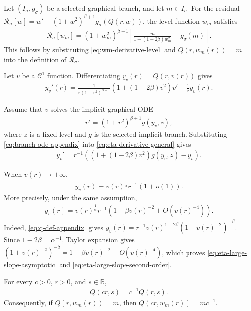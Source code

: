\documentclass{amsart}
\theoremstyle{plain}
\theoremstyle{mainintrothm}
\theoremstyle{definition}
\begin{document}
Let $(I_\sigma,g_\sigma)$ be a selected graphical branch, and let $m\in I_\sigma$.
For the residual
$\mathcal R_\sigma[w]=w'-(1+w^2)^{\beta+1}g_\sigma(Q(r,w))$, the level function
$w_m$ satisfies
\begin{align}
	\label{eq:wm-residual-branch}
	\mathcal R_\sigma[w_m]
	=
	(1+w_m^2)^{\beta+1}
	\left[
	\frac{m}{1+(1-2\beta)w_m^2}
	-
	g_\sigma(m)
	\right].
\end{align}
This follows by substituting \eqref{eq:wm-derivative-level} and
$Q(r,w_m(r))=m$ into the definition of $\mathcal R_\sigma$.

\medskip

Let $v$ be a $\mathcal C^1$ function.  Differentiating
$y_v(r)=Q(r,v(r))$ gives
\begin{align}
	\label{eq:eta-derivative-general}
	y_v'(r)
	=
	\frac{1}{r(1+v^2)^{\beta+1}}
	\left(1+(1-2\beta)v^2\right)v'
	-
	\frac{1}{r}y_v(r).
\end{align}

Assume that $v$ solves the implicit graphical ODE
\begin{align}
	\label{eq:branch-ode-appendix}
	v'
	=
	(1+v^2)^{\beta+1}g(y_v,z),
\end{align}
where $z$ is a fixed level and $g$ is the selected implicit branch.  Substituting
\eqref{eq:branch-ode-appendix} into \eqref{eq:eta-derivative-general} gives
\begin{align}
	\label{eq:eta-derivative-branch}
	y_v'
	=
r^{-1}
	\left(
	\left(1+(1-2\beta)v^2\right)g(y_v,z)
	-
	y_v
	\right).
\end{align}

When $v(r)\to+\infty$,
\begin{align}
	\label{eq:eta-large-slope-asymptotic}
	y_v(r)
	=
	v(r)^{\frac{1}{\alpha}}r^{-1}(1+o(1)).
\end{align}
More precisely, under the same assumption,
\begin{align}
	\label{eq:eta-large-slope-second-order}
	y_v(r)
	=
	v(r)^{\frac{1}{\alpha}}r^{-1}
	\left(1-\beta v(r)^{-2}+O(v(r)^{-4})\right).
\end{align}
Indeed, \eqref{eq:q-def-appendix} gives
$y_v(r)=r^{-1}v(r)^{1-2\beta}(1+v(r)^{-2})^{-\beta}$.  Since
$1-2\beta=\alpha^{-1}$, Taylor expansion gives
$(1+v(r)^{-2})^{-\beta}=1-\beta v(r)^{-2}+O(v(r)^{-4})$, which proves
\eqref{eq:eta-large-slope-asymptotic} and
\eqref{eq:eta-large-slope-second-order}.

\medskip

For every $c>0$, $r>0$, and $s\in\mathbb R$,
\begin{align}
	\label{eq:q-scaling}
	Q(cr,s)=c^{-1}Q(r,s).
\end{align}
Consequently, if $Q(r,w_m(r))=m$, then $Q(cr,w_m(r))=mc^{-1}$.
\end{document}
